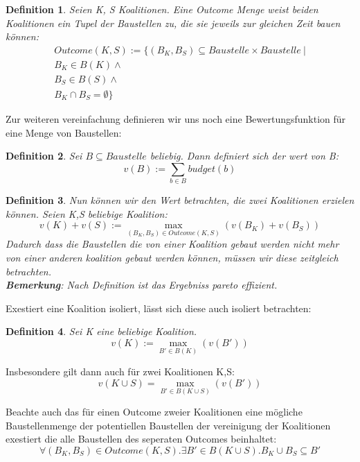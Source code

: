 \documentclass[12pt]{article}
\theoremstyle{break}
\newtheorem{definition}{Definition}
\begin{document}
\begin{definition}
  Seien K, S Koalitionen. Eine Outcome Menge weist beiden Koalitionen ein Tupel der Baustellen zu, die sie jeweils zur gleichen Zeit bauen können:
\begin{eqnarray}
  Outcome(K,S) := \{(B_K,B_S)\subseteq Baustelle\times Baustelle\ |\\B_K\in B(K) \land \\ B_S\in B(S)\land\\B_K\cap B_S =\emptyset \}
\end{eqnarray}
\end{definition}

Zur weiteren vereinfachung definieren wir uns noch eine Bewertungsfunktion für eine Menge von Baustellen:


\begin{definition}
  Sei $B\subseteq Baustelle$ beliebig. Dann definiert sich der wert von B:
  \begin{equation}
    v(B):=\sum_{b\in B} budget(b)
  \end{equation}
\end{definition}


\begin{definition}
  Nun können wir den Wert betrachten, die zwei Koalitionen erzielen können. Seien K,S beliebige Koalition:
\begin{equation}
  v(K) + v(S) := \max_{(B_K, B_S)\in Outcome(K,S)}(v(B_K)+v(B_S))
\end{equation}
Dadurch dass die Baustellen die von einer Koalition gebaut werden nicht mehr von einer anderen koalition gebaut werden können, müssen wir diese zeitgleich betrachten.\\
\textbf{Bemerkung}: Nach Definition ist das Ergebniss pareto effizient.
\end{definition}

Exestiert eine Koalition isoliert, lässt sich diese auch isoliert betrachten:
\begin{definition}
  Sei K eine beliebige Koalition.
  \begin{equation}
    v(K) := \max_{B'\in B(K)}(v(B'))
  \end{equation}
\end{definition}

Insbesondere gilt dann auch für zwei Koalitionen K,S:
\begin{equation}
  v(K\cup S) = \max_{B'\in B(K\cup S)}(v(B'))
\end{equation}

Beachte auch das für einen Outcome zweier Koalitionen eine mögliche Baustellenmenge der potentiellen Baustellen der vereinigung der Koalitionen exestiert die alle Baustellen des seperaten Outcomes beinhaltet:
\begin{equation}
  \forall (B_K, B_S)\in Outcome(K,S).\exists B'\in B(K\cup S).B_K\cup B_S\subseteq B'
\end{equation}
\end{document}
